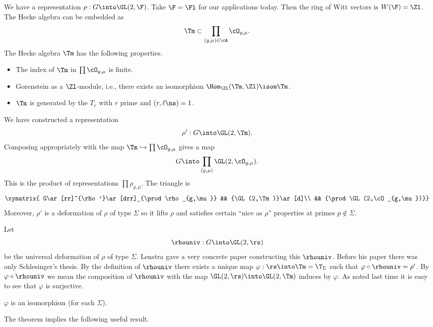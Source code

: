 \documentclass{report}
\begin{document}
We have a representation $\rho:G\into\GL(2,\F)$. Take $\F=\Fl$ for
our applications today. Then the ring of Witt vectors is
$W(\F)=\Zl$. The Hecke algebra can be embedded as
$$\Tm\subset\prod_{(g,\mu)\in \cA}\cO_{g,\mu}.$$
The Hecke algebra $\Tm$ has the following properties.
\begin{itemize}
\item The index of $\Tm$ in $\prod\cO_{g,\mu}$ is finite.
\item Gorenstein as a $\Zl$-module, i.e., there
exists an isomorphism $\Hom_{\Zl}(\Tm,\Zl)\isom\Tm$.
\item $\Tm$ is generated by the $T_r$ with $r$ prime
      and $(r,\ell\ns)=1$.
\end{itemize}

We have constructed a representation
$$\rho':G\into\GL(2,\Tm).$$
Composing appropriately with the map
$\Tm\hookrightarrow \prod\cO_{g,\mu}$
gives a map
  $$G\into\prod_{(g,\mu)}\GL(2,\cO_{g,\mu}).$$
This
is the product of representations $\prod\rho_{g,\mu}$.
The triangle is
$$\xymatrix{
G\ar[rr]^{\rho'}\ar[drr]_{\prod\rho_{g,\mu}} && {\GL(2,\Tm)}\ar[d]\\
                && {\prod\GL(2,\cO_{g,\mu})}}$$
Moreover, $\rho'$ is a deformation of $\rho$ of type
$\Sigma$ so it lifts $\rho$ and satisfies certain
``nice as $\rho$'' properties at primes $p\not\in\Sigma$.

Let
$$\rhouniv:G\into\GL(2,\rs)$$
be the universal deformation of $\rho$ of type $\Sigma$.
Lenstra gave a very concrete paper \cite{lenstra-smit:explicit}
constructing
this $\rhouniv$. Before his paper there was only Schlesinger's thesis.
By the definition of $\rhouniv$ there exists a unique map
$\varphi:\rs\into\Tm=\T_{\Sigma}$ such that
$\varphi\circ\rhouniv=\rho'$. By $\varphi\circ\rhouniv$ we
mean the composition of $\rhouniv$ with the map
$\GL(2,\rs)\into\GL(2,\Tm)$ induces by $\varphi$.
As noted last time it is easy to see that $\varphi$ is surjective.

\begin{theorem} $\varphi$
is an isomorphism (for each $\Sigma$).
\end{theorem}
The theorem implies the following useful result.
\end{document}
